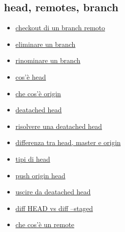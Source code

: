 \documentclass{article} \usepackage[textwidth=19cm,textheight=24cm]{geometry}
\begin{document}
\subsection{head, remotes, branch}
\begin{itemize}
    \item \href{https://stackoverflow.com/questions/1783405/how-do-i-check-out-a-remote-git-branch?rq=1}
        {checkout di un branch remoto}
    \item \href{https://stackoverflow.com/questions/2003505/how-do-i-delete-a-git-branch-locally-and-remotely?rq=1}
        {eliminare un branch}
    \item \href{https://stackoverflow.com/questions/6591213/how-do-i-rename-a-local-git-branch?rq=1}
        {rinominare un branch }
    \item \href{https://stackoverflow.com/questions/2304087/what-is-head-in-git}
        {cos'è head}
    \item \href{https://stackoverflow.com/questions/9529497/what-is-origin-in-git}
        {che cos'è origin}
    \item \href{https://www.git-tower.com/learn/git/faq/detached-head-when-checkout-commit}
        {deatached head}
    \item \href{https://stackoverflow.com/questions/34519665/how-can-i-move-head-back-to-a-previous-location-detached-head-undo-commits}
        {risolvere una deatached head}
    \item \href{https://stackoverflow.com/questions/8196544/what-are-the-git-concepts-of-head-master-origin}
        {differenza tra head, master e origin}
    \item \href{https://stackoverflow.com/questions/20954566/what-is-the-difference-from-head-head-and-head1}
        {tipi di head}
    \item \href{https://stackoverflow.com/questions/23241052/what-does-git-push-origin-head-mean}
        {push origin head}
    \item \href{https://stackoverflow.com/questions/10228760/fix-a-git-detached-head}
        {uscire da deatached head}
    \item \href{https://stackoverflow.com/questions/16562121/git-diff-head-vs-staged}
        {diff HEAD vs diff --staged}
    \item \href{https://stackoverflow.com/questions/20889346/what-does-git-remote-mean}
        {che cos'è un remote}
\end{itemize}
\end{document}
